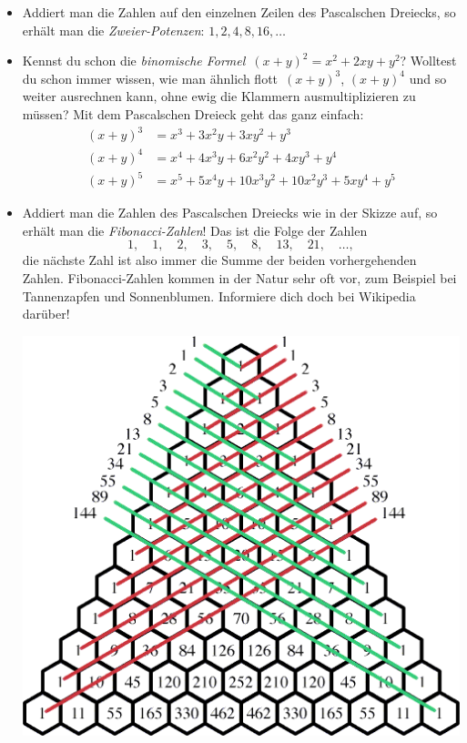 \documentclass[a4paper,ngerman]{scrartcl}
\begin{document}
\begin{itemize}
\item Addiert man die Zahlen auf den einzelnen Zeilen des Pascalschen Dreiecks,
so erhält man die \emph{Zweier-Potenzen}: $1, 2, 4, 8, 16, \ldots$

\item Kennst du schon die \emph{binomische Formel}~$(x+y)^2 = x^2 + 2xy + y^2$?
Wolltest du schon immer wissen, wie man ähnlich flott~$(x+y)^3$, $(x+y)^4$ und
so weiter ausrechnen kann, ohne ewig die Klammern ausmultiplizieren zu müssen?
Mit dem Pascalschen Dreieck geht das ganz einfach:
\begin{align*}
  (x+y)^3 &= x^3 + 3x^2y + 3xy^2 + y^3 \\
  (x+y)^4 &= x^4 + 4x^3y + 6x^2y^2 + 4xy^3 + y^4 \\
  (x+y)^5 &= x^5 + 5x^4y + 10x^3y^2 + 10x^2y^3 + 5xy^4 + y^5
\end{align*}

\item Addiert man die Zahlen des Pascalschen Dreiecks wie in der Skizze auf, so
erhält man die \emph{Fibonacci-Zahlen}! Das ist die Folge der Zahlen
\[ 1, \quad 1, \quad 2, \quad 3, \quad 5, \quad 8, \quad 13, \quad 21, \quad
\ldots, \]
die nächste Zahl ist also immer die Summe der beiden vorhergehenden Zahlen.
Fi\-bo\-nac\-ci-Zahlen kommen in der Natur sehr oft vor, zum Beispiel bei
Tannenzapfen und Sonnenblumen. Informiere dich doch bei Wikipedia darüber!

\begin{center}
\includegraphics[scale=0.9]{pascal-fibonacci}
\end{center}
\end{itemize}
\end{document}
